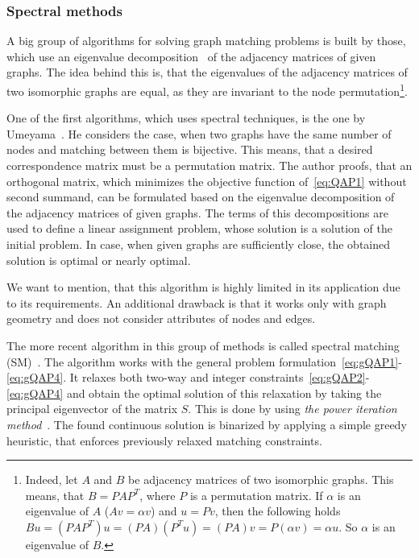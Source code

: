 \subsubsection{Spectral methods}
A big group of algorithms for solving graph matching problems is built by those, which use an eigenvalue decomposition~\cite{Book_ConvOpt} of the adjacency matrices of given graphs. The idea behind this is, that the eigenvalues of the adjacency matrices of two isomorphic graphs are equal, as they are invariant to the node permutation\footnote{Indeed, let $A$ and $B$ be adjacency matrices of two isomorphic graphs. This means, that $B=PAP^T$, where $P$ is a permutation matrix. If $\alpha$ is an eigenvalue of $A$ ($Av=\alpha v$) and $u=Pv$, then the following holds $Bu=(PAP^T)u=(PA)(P^Tu)=(PA)v=P(\alpha v)=\alpha u$. So $\alpha$ is an eigenvalue of $B$.}.

One of the first algorithms, which uses spectral techniques, is the one by Umeyama\newline~\cite{Umeyam1988}. He considers the case, when two graphs have the same number of nodes and matching between them is bijective. This means, that a desired correspondence matrix must be a permutation matrix. The author proofs, that an orthogonal matrix, which minimizes the objective function of~\eqref{eq:QAP1} without second summand, can be formulated based on the eigenvalue decomposition of the adjacency matrices of given graphs. The terms of this decompositions are used to define a linear assignment problem, whose solution is a solution of the initial problem. In case, when given graphs are sufficiently close, the obtained solution is optimal or nearly optimal.

We want to mention, that this algorithm is highly limited in its application due to its requirements. An additional drawback is that it works only with graph geometry and does not consider attributes of nodes and edges.

The more recent algorithm in this group of methods is called spectral matching (SM)~\cite{Leordeanu2005_SM}. The algorithm works with the general problem formulation~\eqref{eq:gQAP1}-\eqref{eq:gQAP4}. It relaxes both two-way and integer constraints~\eqref{eq:gQAP2}-\eqref{eq:gQAP4} and obtain the optimal solution of this relaxation by taking the principal eigenvector of the matrix $S$. This is done by using \emph{the power iteration method}~\cite{PowerIteration}. The found continuous solution is binarized by applying a simple greedy heuristic, that enforces previously relaxed matching constraints.

